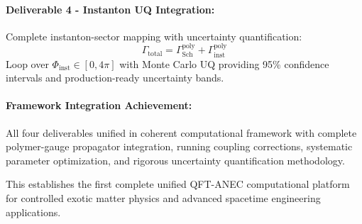 \documentclass[11pt]{article}
\begin{document}
\paragraph{Deliverable 4 - Instanton UQ Integration:}
Complete instanton-sector mapping with uncertainty quantification:
\[
  \Gamma_{\text{total}} = \Gamma_{\text{Sch}}^{\text{poly}} + \Gamma_{\text{inst}}^{\text{poly}}
\]
Loop over $\Phi_{\text{inst}} \in [0, 4\pi]$ with Monte Carlo UQ providing 95\% confidence intervals and production-ready uncertainty bands.

\paragraph{Framework Integration Achievement:}
All four deliverables unified in coherent computational framework with complete polymer-gauge propagator integration, running coupling corrections, systematic parameter optimization, and rigorous uncertainty quantification methodology.

This establishes the first complete unified QFT-ANEC computational platform for controlled exotic matter physics and advanced spacetime engineering applications.
\end{document}
